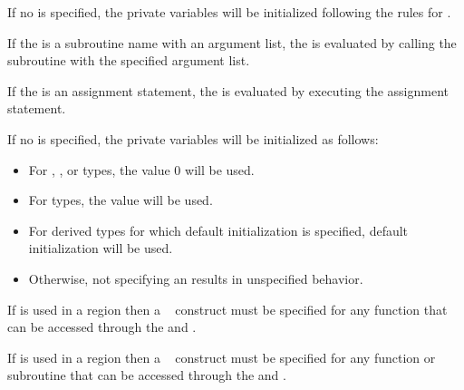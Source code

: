 \begin{cppspecific}
If no  is specified, the private variables will be 
initialized following the rules for .
\end{cppspecific}

\begin{fortranspecific}
If the  is a subroutine name with an argument list, 
the  is evaluated by calling the subroutine with the  
specified argument list.

If the  is an assignment statement, the 
 is evaluated by executing the assignment statement.

If no  is specified, the private variables will be 
initialized as follows:

\begin{itemize}
\item For , , or  types, the value 0 
      will be used.
\item For  types, the value  will be used.
\item For derived types for which default initialization is specified, default 
      initialization will be used.
\item Otherwise, not specifying an  results in unspecified 
      behavior.
\end{itemize}
\end{fortranspecific}

\begin{ccppspecific}
If  is used in a  region then a 
~ construct must be specified for any function 
that can be accessed through the  and
.
\end{ccppspecific}

\begin{fortranspecific}
If  is used in a  region then a 
~ construct must be specified for any function 
or subroutine that can be accessed through the  
and .
\end{fortranspecific}

